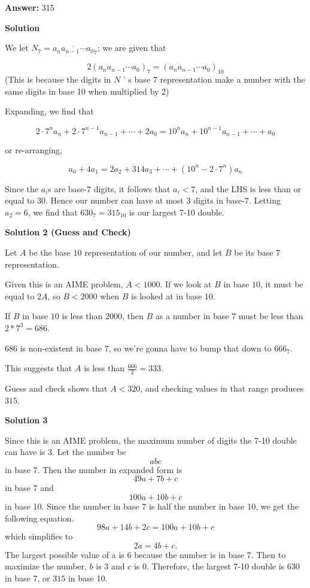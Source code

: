 \begin{enumerate}
 
 \textbf{Answer: }315



\textbf{Solution}

We let $N_7 = \overline{a_na_{n-1}\cdots a_0}_7$; we are given that

 
 \[2(a_na_{n-1}\cdots a_0)_7 = (a_na_{n-1}\cdots a_0)_{10}\] (This is because the digits in $N$ ' s base 7 representation make a number with the same digits in base 10 when multiplied by 2)

 Expanding, we find that

 
 \[2 \cdot 7^n a_n + 2 \cdot 7^{n-1} a_{n-1} + \cdots + 2a_0 = 10^na_n + 10^{n-1}a_{n-1} + \cdots + a_0\]

 or re-arranging,

 
 \[a_0 + 4a_1 = 2a_2 + 314a_3 + \cdots + (10^n - 2 \cdot 7^n)a_n\]

 Since the $a_i$s are base-$7$ digits, it follows that $a_i < 7$, and the LHS is less than or equal to $30$. Hence our number can have at most $3$ digits in base-$7$. Letting $a_2 = 6$, we find that $630_7 = \boxed{315}_{10}$ is our largest 7-10 double.

 



\textbf{Solution 2 (Guess and Check)}

Let $A$ be the base $10$ representation of our number, and let $B$ be its base $7$ representation.

 Given this is an AIME problem, $A<1000$. If we look at $B$ in base $10$, it must be equal to $2A$, so $B<2000$ when $B$ is looked at in base $10.$

 If $B$ in base $10$ is less than $2000$, then $B$ as a number in base $7$ must be less than $2*7^3=686$.

 $686$ is non-existent in base $7$, so we're gonna have to bump that down to $666_7$. 

 This suggests that $A$ is less than $\frac{666}{2}=333$. 

 Guess and check shows that $A<320$, and checking values in that range produces $\boxed{315}$.

 


 



\textbf{Solution 3}

Since this is an AIME problem, the maximum number of digits the 7-10 double can have is 3.  Let the number be 
 \[abc\] in base 7. Then the number in expanded form is 
 \[49a+7b+c\] in base 7 and 
 \[100a+10b+c\] in base 10.  Since the number in base 7 is half the number in base 10, we get the following equation.
 \[98a+14b+2c=100a+10b+c\] which simplifies to 
 \[2a=4b+c.\]  The largest possible value of a is 6 because the number is in base 7.  Then to maximize the number, $b$ is $3$ and $c$ is $0$.  Therefore, the largest 7-10 double is 630 in base 7, or $\boxed{315}$ in base 10.


\end{enumerate}
